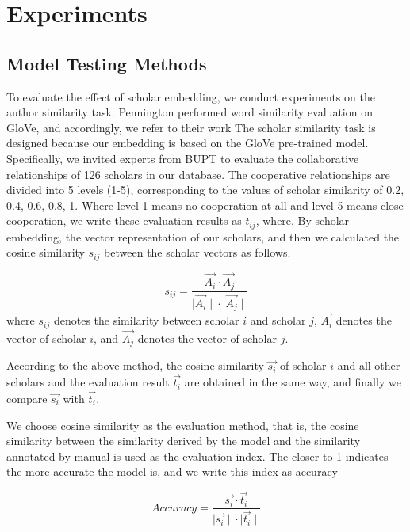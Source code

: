 \documentclass[a4paper]{jpconf}
\begin{document}
\section{Experiments}
\subsection{Model Testing Methods}
To evaluate the effect of scholar embedding, we conduct experiments on
the author similarity task. Pennington \cite{GloVe}
performed word similarity evaluation \cite{https://doi.org/10.48550/arxiv.2211.08203} on GloVe, and accordingly, we refer
to their work The scholar similarity task is designed because our
embedding is based on the GloVe pre-trained model. Specifically, we
invited experts from BUPT to evaluate the collaborative relationships of 126 scholars in our
database. The cooperative relationships are divided into 5 levels (1-5), corresponding to the values of scholar similarity of 0.2, 0.4,
0.6, 0.8, 1. Where level 1 means no cooperation at all and level 5 means
close cooperation, we write these evaluation results as \(t_{ij}\),
where. By scholar embedding, the vector representation of our scholars,
and then we calculated the cosine similarity \(s_{ij}\) between the
scholar vectors as follows.

\begin{equation}\label{eq:s}
    s_{ij} = \frac{\vec{A_i} \cdot \vec{A_j}}{{\mid \vec{A_i} \mid} \cdot {\mid \vec{A_j} \mid}}
\end{equation}
where \(s_{ij}\) denotes the similarity between scholar \(i\) and
scholar \(j\), \(\vec{A_i}\) denotes the vector of scholar \(i\), and
\(\vec{A_j}\) denotes the vector of scholar \(j\).

According to the above method, the cosine similarity \(\vec{s_i}\) of
scholar \(i\) and all other scholars and the evaluation result
\(\vec{t_{i}}\) are obtained in the same way, and finally we compare
\(\vec{s_i}\) with \(\vec{t_i}\).

We choose cosine similarity as the evaluation method, that is, the cosine similarity between the similarity derived by the model and the similarity annotated by manual is used as the evaluation index. The closer to 1 indicates the more accurate the model is, and we write this index as accuracy

\begin{equation}\label{eq:Accuracy}
    Accuracy = \frac{\vec{s_i} \cdot \vec{t_{i}}}{{\mid \vec{s_i} \mid} \cdot {\mid \vec{t_{i}} \mid}}
\end{equation}
\end{document}
